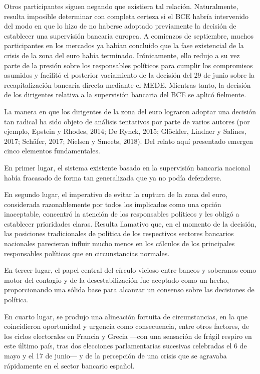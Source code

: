 \documentclass[10pt,a4paper]{article}
\begin{document}
{Otros participantes siguen negando que existiera tal relación. Naturalmente, resulta imposible determinar con completa certeza si el BCE habría intervenido del modo en que lo hizo de no haberse adoptado previamente la decisión de establecer una supervisión bancaria europea. A comienzos de septiembre, muchos participantes en los mercados ya habían concluido que la fase existencial de la crisis de la zona del euro había terminado. Irónicamente, ello redujo a su vez parte de la presión sobre los responsables políticos para cumplir los compromisos asumidos y facilitó el posterior vaciamiento de la decisión del 29 de junio sobre la recapitalización bancaria directa mediante el MEDE. Mientras tanto, la decisión de los dirigentes relativa a la supervisión bancaria del BCE se aplicó fielmente.

La manera en que los dirigentes de la zona del euro lograron adoptar una decisión tan radical ha sido objeto de análisis tentativos por parte de varios autores (por ejemplo, Epstein y Rhodes, 2014; De Rynck, 2015; Glöckler, Lindner y Salines, 2017; Schäfer, 2017; Nielsen y Smeets, 2018). Del relato aquí presentado emergen cinco elementos fundamentales.

En primer lugar, el sistema existente basado en la supervisión bancaria nacional había fracasado de forma tan generalizada que ya no podía defenderse.

En segundo lugar, el imperativo de evitar la ruptura de la zona del euro, considerada razonablemente por todos los implicados como una opción inaceptable, concentró la atención de los responsables políticos y les obligó a establecer prioridades claras. Resulta llamativo que, en el momento de la decisión, las posiciones tradicionales de política de los respectivos sectores bancarios nacionales parecieran influir mucho menos en los cálculos de los principales responsables políticos que en circunstancias normales.

En tercer lugar, el papel central del círculo vicioso entre bancos y soberanos como motor del contagio y de la desestabilización fue aceptado como un hecho, proporcionando una sólida base para alcanzar un consenso sobre las decisiones de política.

En cuarto lugar, se produjo una alineación fortuita de circunstancias, en la que coincidieron oportunidad y urgencia como consecuencia, entre otros factores, de los ciclos electorales en Francia y Grecia —con una sensación de frágil respiro en este último país, tras dos elecciones parlamentarias sucesivas celebradas el 6 de mayo y el 17 de junio— y de la percepción de una crisis que se agravaba rápidamente en el sector bancario español.

}
\end{document}
